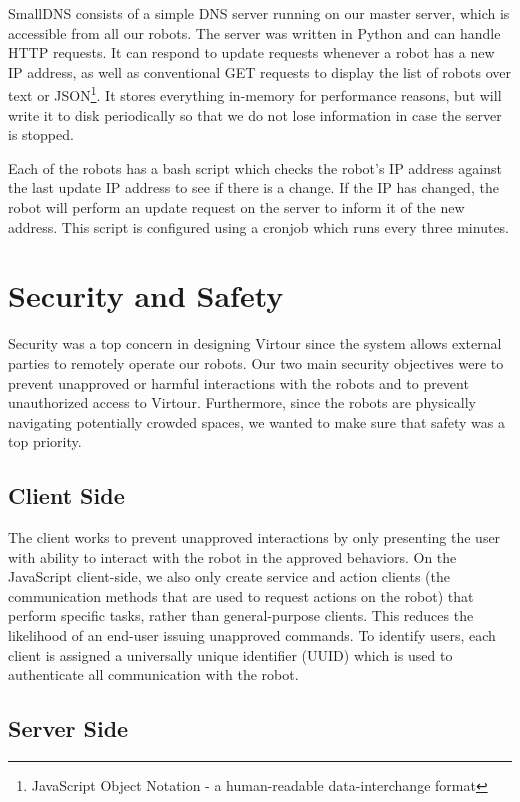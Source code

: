 \documentclass[
  oneside,
  11pt, a4paper,
  footinclude=true,
  headinclude=true,
  cleardoublepage=empty
]{article}
\begin{document}
SmallDNS consists of a simple DNS server running on our master server, which is
accessible from all our robots. The server was written in Python and can
handle HTTP requests. It can respond to update requests whenever a robot has
a new IP address, as well as conventional GET requests to display the list of
robots over text or JSON\footnote{JavaScript Object Notation - a human-readable
data-interchange format}. It stores everything in-memory for performance
reasons, but will write it to disk periodically so that we do not lose
information in case the server is stopped.

Each of the robots has a bash script which checks the robot's IP address against the
last update IP address to see if there is a change. If the IP has changed, the robot
will perform an update request on the server to inform it of the new address. This
script is configured using a cronjob which runs every three minutes.

\section{Security and Safety}\label{sec:security}

Security was a top concern in designing Virtour since the system allows
external parties to remotely operate our robots. Our two main security
objectives were to prevent unapproved or harmful interactions with the robots
and to prevent unauthorized access to Virtour. Furthermore, since the robots
are physically navigating potentially crowded spaces, we wanted to make sure
that safety was a top priority.

\subsection{Client Side}

The client works to prevent unapproved interactions by only presenting the user
with ability to interact with the robot in the approved behaviors. On the
JavaScript client-side, we also only create service and action clients (the
communication methods that are used to request actions on the robot) that
perform specific tasks, rather than general-purpose clients. This reduces the
likelihood of an end-user issuing unapproved commands. To identify users, each
client is assigned a universally unique identifier (UUID) which is used to
authenticate all communication with the robot.

\subsection{Server Side}
\end{document}

